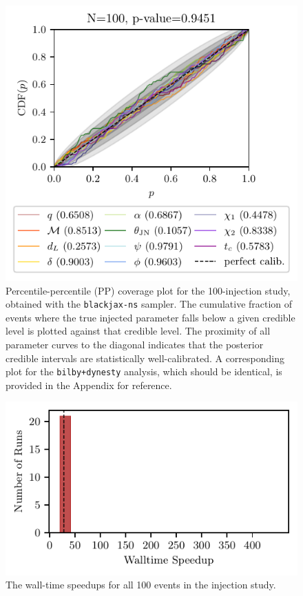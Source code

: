 \documentclass[fleqn,usenatbib]{mnras}
\begin{document}
\begin{figure}
    \centering
    \includegraphics[width=\columnwidth]{figures/pp_coverage_blackjax.pdf}
    \caption{Percentile-percentile (PP) coverage plot for the
    100-injection study, obtained with the \texttt{blackjax-ns}
    sampler. The cumulative fraction of events where the true
    injected parameter falls below a given credible level is plotted
    against that credible level. The proximity of all parameter curves
    to the diagonal indicates that the posterior credible intervals
    are statistically well-calibrated. A corresponding plot for the
    \texttt{bilby+dynesty} analysis, which should be identical,
    is provided in the Appendix for reference.}
    \label{fig:pp_coverage}
\end{figure}

\begin{figure}
    \centering
    \includegraphics{figures/walltime_speedup.pdf}
    \caption{The wall-time speedups for all 100 events in the injection study.}
    \label{fig:speedup_comparison}
\end{figure}
\end{document}
